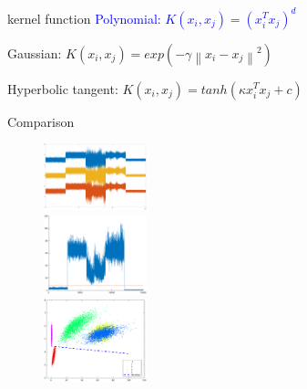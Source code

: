\documentclass[10pt]{beamer}
\newcommand{\norm}[1]{\left\lVert#1\right\rVert}
\begin{document}
\begin{frame}{kernel function}
    \textcolor{blue}{Polynomial: $K(x_i,x_j) = (x_i^Tx_j)^d$} \par
    Gaussian:  $K(x_i,x_j) = exp(-\gamma \norm{x_i-x_j}^2)$ \par
    Hyperbolic tangent: $K(x_i,x_j) = tanh(\kappa x_i^Tx_j+c)$
    \end{frame}
    \begin{frame}{Comparison}
         \begin{figure}
        \centering
        \includegraphics[width=3cm]{fig/Coriginal.eps} \\
        \includegraphics[width=3cm]{fig/thresholdT.eps} \\
        \includegraphics[width=3cm]{fig/miniVarP.eps}
        \end{figure}
    \end{frame}
\end{document}
